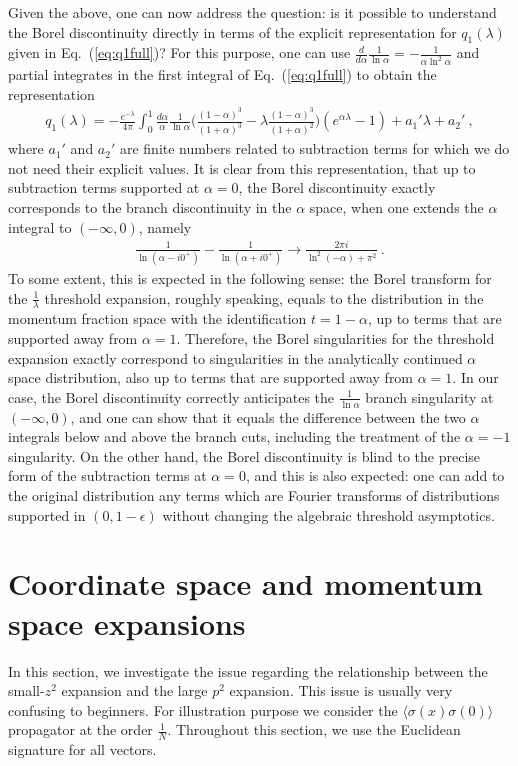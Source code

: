 \documentclass[a4paper,11pt]{article}
\begin{document}
Given the above, one can now address the question: is it possible to understand the Borel discontinuity directly in terms of the explicit representation for $q_1(\lambda)$ given in Eq.~(\ref{eq:q1full})?  
For this purpose, one can use $\frac{d}{d\alpha}\frac{1}{\ln\alpha}=-\frac{1}{\alpha \ln^2\alpha}$ and partial integrates in the first integral of Eq.~(\ref{eq:q1full}) to obtain the representation
\begin{align}
q_1(\lambda)=-\frac{e^{-\lambda}}{4\pi}\int_{0}^{1}\frac{d\alpha}{\alpha}\frac{1}{\ln \alpha}\bigg(\frac{(1-\alpha)^3}{(1+\alpha)^3}-\lambda \frac{(1-\alpha)^3}{(1+\alpha)^2}\bigg)\left(e^{\alpha\lambda}-1\right)+a_1'\lambda+a_2'\ , 
\end{align}
where $a_1'$ and $a_2'$ are finite numbers related to subtraction terms for which we do not need their explicit values. It is clear from this representation, that up to subtraction terms supported at $\alpha=0$, the Borel discontinuity exactly corresponds to the branch discontinuity in the $\alpha$ space, when one extends the $\alpha$ integral to $(-\infty,0)$, namely
\begin{align}
\frac{1}{\ln (\alpha-i0^+)}-\frac{1}{\ln (\alpha+i0^+)} \rightarrow \frac{2\pi i}{\ln^2(-\alpha)+\pi^2} \ .
\end{align}
To some extent, this is expected in the following sense: the Borel transform for the $\frac{1}{\lambda}$ threshold expansion, roughly speaking, equals to the distribution in the momentum fraction space with the identification $t=1-\alpha$, up to terms that are supported away from $\alpha=1$. Therefore, the Borel singularities for the threshold expansion exactly correspond to singularities in the analytically continued $\alpha$ space distribution, also up to terms that are supported away from $\alpha=1$. In our case, the Borel discontinuity correctly anticipates the $\frac{1}{\ln \alpha}$ branch singularity at $(-\infty,0)$, and one 
can show that it equals the difference between the two $\alpha$ integrals below and above the branch cuts, including the treatment of the  $\alpha=-1$ singularity. On the other hand, the Borel discontinuity is blind to the precise form of the subtraction terms at $\alpha=0$, and this is also expected: one can add to the original distribution any terms which are Fourier transforms of distributions supported in $(0,1-\epsilon)$ without changing the algebraic threshold asymptotics. 

 \section{Coordinate space and momentum space expansions}
In this section, we investigate the issue regarding the relationship between the small-$z^2$ expansion and the large $p^2$ expansion. This issue is usually very confusing to beginners. For illustration purpose we consider the $\langle \sigma(x)\sigma(0)\rangle$ propagator at the order $\frac{1}{N}$. Throughout this section, we use the Euclidean signature for all vectors. 
\end{document}
